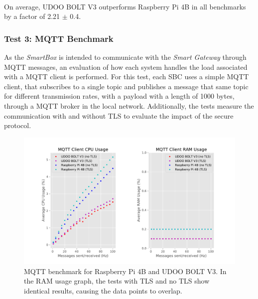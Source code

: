 \paragraph{} On average, UDOO BOLT V3 outperforms Raspberry Pi 4B in all benchmarks by a factor of 2.21 $\pm$ 0.4.

\subsubsection{Test 3: \acs{MQTT} Benchmark}

As the \textit{SmartBox} is intended to communicate with the \textit{Smart Gateway} through \acs{MQTT} messages, an evaluation of how each system handles the load associated with a \acs{MQTT} client is performed. For this test, each \acs{SBC} uses a simple \acs{MQTT} client, that subscribes to a single topic and publishes a message that same topic for different transmission rates, with a payload with a length of 1000 bytes, through a \acs{MQTT} broker in the local network. Additionally, the tests measure the communication with and without \acs{TLS} to evaluate the impact of the secure protocol.

\begin{figure}[H]
    \centering
    \includegraphics[width=\linewidth]{images/mqtt_test_results.pdf}
    \caption[\acs{MQTT} benchmark for Raspberry Pi 4B and UDOO BOLT V3.]{\acs{MQTT} benchmark for Raspberry Pi 4B and UDOO BOLT V3. In the \acs{RAM} usage graph, the tests with TLS and no TLS show identical results, causing the data points to overlap.}
    \label{fig:mqtt-tests}
\end{figure}

